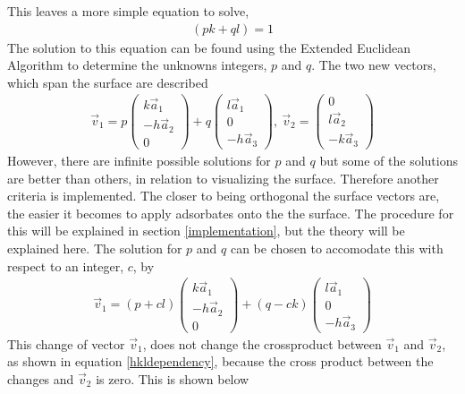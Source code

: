 \documentclass[11pt]{article} %
\begin{document}
This leaves a more simple equation to solve, 
\begin{eqnarray}
(pk + ql) = 1 \label{EquationFromTheory}
\end{eqnarray}
The solution to this equation can be found using the Extended Euclidean Algorithm to determine the unknowns integers, $p$ and $q$. The two new vectors, which span the surface are described
\begin{eqnarray}
\vec{v}_1 = p \left( \begin{array}{c} k\vec{a}_1 \\ - h \vec{a}_2 \\ 0 \end{array} \right) + q \left( \begin{array}{c} l \vec{a}_1 \\ 0 \\ - h \vec{a}_3 \end{array} \right), \ \vec{v}_2 = \left( \begin{array}{c} 0 \\ l\vec{a}_2 \\ -k\vec{a}_3 \end{array} \right) \label{v2formalism}
\end{eqnarray}
However, there are infinite possible solutions for $p$ and $q$ but some of the solutions are better than others, in relation to visualizing the surface. Therefore another criteria is implemented. The closer to being orthogonal the surface vectors are, the easier it becomes to apply adsorbates onto the the surface. The procedure for this will be explained in section \ref{implementation}, but the theory will be explained here. The solution for $p$ and $q$ can be chosen to accomodate this with respect to an integer, $c$, by
\begin{eqnarray}
\vec{v}_1 = (p+cl)\left( \begin{array}{c} k\vec{a}_1 \\ - h \vec{a}_2 \\ 0 \end{array} \right) + (q-ck)\left( \begin{array}{c} l \vec{a}_1 \\ 0 \\ - h \vec{a}_3 \end{array} \right) \label{v1formalism}
\end{eqnarray}
This change of vector $\vec{v}_1$, does not change the crossproduct between $\vec{v}_1$ and $\vec{v}_2$, as shown in equation \ref{hkldependency}, because the cross product between the changes and $\vec{v}_2$ is zero. This is shown below
\end{document}
